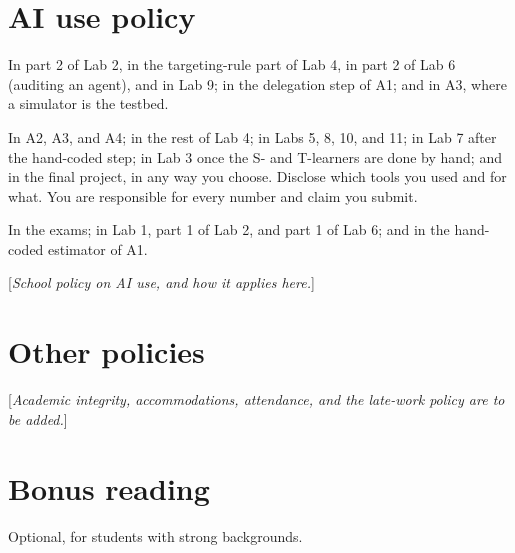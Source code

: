 \documentclass[11pt]{article}
\newcommand{\tbd}[1]{\textcolor{warnred}{[\emph{#1}]}}
\begin{document}
\section*{AI use policy}

\begin{description}[leftmargin=1.5em, style=nextline]
\item[Required] In part 2 of Lab 2, in the targeting-rule part of Lab 4, in part 2 of Lab 6 (auditing an agent), and in
Lab 9;
in the delegation step of A1; and in A3, where a simulator is the testbed.
\item[Allowed, with disclosure] In A2, A3, and A4; in the rest of Lab 4; in Labs 5, 8, 10, and 11; in Lab 7 after
the hand-coded step; in Lab 3 once the S- and T-learners are done by hand; and in the final project, in
any way you choose. Disclose which tools you used and for what. You are responsible for every number
and claim you submit.
\item[Prohibited] In the exams; in
Lab 1, part 1 of Lab 2, and part 1 of Lab 6; and in the hand-coded estimator of A1.
\end{description}
\tbd{School policy on AI use, and how it applies here.}

\section*{Other policies}

\tbd{Academic integrity, accommodations, attendance, and the late-work policy are to be added.}

\section*{Bonus reading}

Optional, for students with strong backgrounds.
\end{document}

